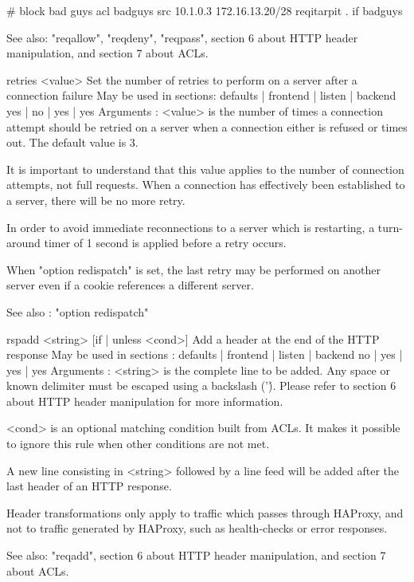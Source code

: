      # block bad guys
     acl badguys src 10.1.0.3 172.16.13.20/28
     reqitarpit . if badguys

  See also: "reqallow", "reqdeny", "reqpass", section 6 about HTTP header
            manipulation, and section 7 about ACLs.


retries <value>
  Set the number of retries to perform on a server after a connection failure
  May be used in sections:    defaults | frontend | listen | backend
                                 yes   |    no    |   yes  |   yes
  Arguments :
    <value>   is the number of times a connection attempt should be retried on
              a server when a connection either is refused or times out. The
              default value is 3.

  It is important to understand that this value applies to the number of
  connection attempts, not full requests. When a connection has effectively
  been established to a server, there will be no more retry.

  In order to avoid immediate reconnections to a server which is restarting,
  a turn-around timer of 1 second is applied before a retry occurs.

  When "option redispatch" is set, the last retry may be performed on another
  server even if a cookie references a different server.

  See also : "option redispatch"


rspadd <string> [{if | unless} <cond>]
  Add a header at the end of the HTTP response
  May be used in sections :   defaults | frontend | listen | backend
                                 no    |    yes   |   yes  |   yes
  Arguments :
    <string>  is the complete line to be added. Any space or known delimiter
              must be escaped using a backslash ('\'). Please refer to section
              6 about HTTP header manipulation for more information.

    <cond>    is an optional matching condition built from ACLs. It makes it
              possible to ignore this rule when other conditions are not met.

  A new line consisting in <string> followed by a line feed will be added after
  the last header of an HTTP response.

  Header transformations only apply to traffic which passes through HAProxy,
  and not to traffic generated by HAProxy, such as health-checks or error
  responses.

  See also: "reqadd", section 6 about HTTP header manipulation, and section 7
            about ACLs.


